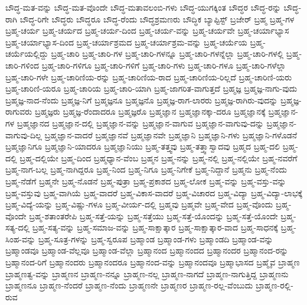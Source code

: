 {ಬೌದ್ಧ-ಮತ-ವನ್ನು
ಬೌದ್ಧ-ಮತ-ವೊಂದೇ
ಬೌದ್ಧ-ಮತಾವಲಂಬಿ-ಗಳು
ಬೌದ್ಧ-ಯುಗಕ್ಕಿಂತ
ಬೌದ್ಧರ
ಬೌದ್ಧ-ರನ್ನು
ಬೌದ್ಧ-ರಾಗಿ
ಬೌದ್ಧ-ರಿಗೇ
ಬೌದ್ಧರು
ಬೌದ್ಧರೂ
ಬೌದ್ಧ-ರೆಂದು
ಬೌದ್ಧಶ್ರಮಣರು
ಬೌದ್ಧಿಕ
ಬ್ಯಾಪ್ಟಿಸ್ಟ್
ಬ್ರಜೇರ್
ಬ್ರಹ್ಮ
ಬ್ರಹ್ಮ-ಗಳ
ಬ್ರಹ್ಮ-ಚರ್ಯ
ಬ್ರಹ್ಮ-ಚರ್ಯದ
ಬ್ರಹ್ಮ-ಚರ್ಯ-ದಿಂದ
ಬ್ರಹ್ಮ-ಚರ್ಯ-ವನ್ನು
ಬ್ರಹ್ಮ-ಚರ್ಯವೇ
ಬ್ರಹ್ಮ-ಚರ್ಯಾಭ್ಯಾಸ
ಬ್ರಹ್ಮ-ಚರ್ಯಾಭ್ಯಾಸ-ದಿಂದ
ಬ್ರಹ್ಮ-ಚರ್ಯಾಶ್ರಮದ
ಬ್ರಹ್ಮ-ಚರ್ಯಾಶ್ರಮ-ವನ್ನು
ಬ್ರಹ್ಮ-ಚರ್ಯೆಯ
ಬ್ರಹ್ಮ-ಚರ್ಯೆಯಲ್ಲಿದ್ದು
ಬ್ರಹ್ಮ-ಚಾರಿ
ಬ್ರಹ್ಮ-ಚಾರಿ-ಗಳ
ಬ್ರಹ್ಮ-ಚಾರಿ-ಗಳನ್ನೂ
ಬ್ರಹ್ಮ-ಚಾರಿ-ಗಳನ್ನೆಲ್ಲಾ
ಬ್ರಹ್ಮ-ಚಾರಿ-ಗಳಲ್ಲಿ
ಬ್ರಹ್ಮ-ಚಾರಿ-ಗಳಿಂದ
ಬ್ರಹ್ಮ-ಚಾರಿ-ಗಳಿಗೂ
ಬ್ರಹ್ಮ-ಚಾರಿ-ಗಳಿಗೆ
ಬ್ರಹ್ಮ-ಚಾರಿ-ಗಳು
ಬ್ರಹ್ಮ-ಚಾರಿ-ಗಳೂ
ಬ್ರಹ್ಮ-ಚಾರಿ-ಗಳೆಲ್ಲಾ
ಬ್ರಹ್ಮ-ಚಾರಿ-ಗಳೇ
ಬ್ರಹ್ಮ-ಚಾರಿಣಿಯ-ರನ್ನು
ಬ್ರಹ್ಮ-ಚಾರಿಣಿಯ-ರಾದ
ಬ್ರಹ್ಮ-ಚಾರಿಣಿಯ-ರಿಲ್ಲದೆ
ಬ್ರಹ್ಮ-ಚಾರಿಣಿ-ಯರು
ಬ್ರಹ್ಮ-ಚಾರಿಣಿ-ಯರೂ
ಬ್ರಹ್ಮ-ಚಾರಿಯ
ಬ್ರಹ್ಮ-ಚಾರಿ-ಯಾಗಿ
ಬ್ರಹ್ಮ-ಜಾಗರಿತ-ವಾಗುತ್ತದೆ
ಬ್ರಹ್ಮಜ್ಞ
ಬ್ರಹ್ಮಜ್ಞ-ನಾಗು-ವುದು
ಬ್ರಹ್ಮಜ್ಞ-ನಾದ-ನೆಂದು
ಬ್ರಹ್ಮಜ್ಞ-ನಿಗೆ
ಬ್ರಹ್ಮಜ್ಞನೂ
ಬ್ರಹ್ಮಜ್ಞನೊ
ಬ್ರಹ್ಮಜ್ಞ-ರಾಗ-ಲಾರರು
ಬ್ರಹ್ಮಜ್ಞ-ರಾಗಿರು-ವುದನ್ನು
ಬ್ರಹ್ಮಜ್ಞ-ರಾಗುವರು
ಬ್ರಹ್ಮಜ್ಞರು
ಬ್ರಹ್ಮಜ್ಞ-ರೆಂದಾದರೂ
ಬ್ರಹ್ಮಜ್ಞರೊ
ಬ್ರಹ್ಮಜ್ಞಾನ
ಬ್ರಹ್ಮಜ್ಞಾನಕ್ಕಾ-ದರೂ
ಬ್ರಹ್ಮಜ್ಞಾನಕ್ಕೆ
ಬ್ರಹ್ಮಜ್ಞಾನ-ಗಳ
ಬ್ರಹ್ಮಜ್ಞಾನದ
ಬ್ರಹ್ಮಜ್ಞಾನ-ದಲ್ಲಿ
ಬ್ರಹ್ಮಜ್ಞಾನ-ವನ್ನು
ಬ್ರಹ್ಮಜ್ಞಾನ-ವಾಗುವ
ಬ್ರಹ್ಮಜ್ಞಾನ-ವಾಗುವು-ದನ್ನು
ಬ್ರಹ್ಮಜ್ಞಾನ-ವಾಗುವು-ದಿಲ್ಲ
ಬ್ರಹ್ಮಜ್ಞಾನ-ವಾದರೆ
ಬ್ರಹ್ಮಜ್ಞಾನವೆ
ಬ್ರಹ್ಮಜ್ಞಾನವೇ
ಬ್ರಹ್ಮಜ್ಞಾನಿ
ಬ್ರಹ್ಮಜ್ಞಾನಿ-ಗಳು
ಬ್ರಹ್ಮಜ್ಞಾನಿ-ಗಳೊಡನೆ
ಬ್ರಹ್ಮಜ್ಞಾನಿಗೂ
ಬ್ರಹ್ಮಜ್ಞಾನಿ-ಯಾದರೂ
ಬ್ರಹ್ಮಜ್ಞಾನಿಯು
ಬ್ರಹ್ಮ-ತತ್ತ್ವವು
ಬ್ರಹ್ಮ-ತತ್ತ್ವಾಸ್ವಾದವು
ಬ್ರಹ್ಮದ
ಬ್ರಹ್ಮ-ದಲಿ
ಬ್ರಹ್ಮ-ದಲ್ಲಿ
ಬ್ರಹ್ಮ-ದಲ್ಲಿಯೇ
ಬ್ರಹ್ಮ-ದಿಂದ
ಬ್ರಹ್ಮಧ್ಯಾನ-ವೆಂಬ
ಬ್ರಹ್ಮನ
ಬ್ರಹ್ಮ-ನನ್ನು
ಬ್ರಹ್ಮ-ನಲ್ಲಿ
ಬ್ರಹ್ಮ-ನಲ್ಲಿಯೇ
ಬ್ರಹ್ಮ-ನವರೆಗೆ
ಬ್ರಹ್ಮ-ನಾಗ-ಬಲ್ಲ
ಬ್ರಹ್ಮ-ನಾಗಿದ್ದರೂ
ಬ್ರಹ್ಮ-ನಿಂದ
ಬ್ರಹ್ಮ-ನಿಗೂ
ಬ್ರಹ್ಮ-ನಿಗೇಕೆ
ಬ್ರಹ್ಮ-ನಿದ್ದಾನೆ
ಬ್ರಹ್ಮನು
ಬ್ರಹ್ಮ-ನೆಂದು
ಬ್ರಹ್ಮ-ನೆಡೆಗೆ
ಬ್ರಹ್ಮನೇ
ಬ್ರಹ್ಮ-ನೊಡನೆ
ಬ್ರಹ್ಮ-ಪುತ್ರಾ
ಬ್ರಹ್ಮ-ಪ್ರಕಾಶದ
ಬ್ರಹ್ಮ-ಲೋಕ
ಬ್ರಹ್ಮ-ವನ್ನು
ಬ್ರಹ್ಮ-ವಸ್ತು-ವನ್ನು
ಬ್ರಹ್ಮ-ವಸ್ತುವು
ಬ್ರಹ್ಮ-ವಾಗಿಯೆ
ಬ್ರಹ್ಮ-ವಾದರೆ
ಬ್ರಹ್ಮ-ವಿಕಾಸ-ವಾದರೆ
ಬ್ರಹ್ಮ-ವಿಚಾರದ
ಬ್ರಹ್ಮ-ವಿದ್ಯಾ
ಬ್ರಹ್ಮ-ವಿದ್ಯಾ-ಲಾಭಕ್ಕೆ
ಬ್ರಹ್ಮ-ವಿದ್ಯೆ-ಯನ್ನು
ಬ್ರಹ್ಮ-ವಿಷ್ಣು-ಗಳೂ
ಬ್ರಹ್ಮ-ವೀರ್ಯ-ದಲ್ಲಿ
ಬ್ರಹ್ಮವು
ಬ್ರಹ್ಮವೇ
ಬ್ರಹ್ಮ-ವೇದ
ಬ್ರಹ್ಮ-ವೊಂದು
ಬ್ರಹ್ಮ-ವೊಂದೇ
ಬ್ರಹ್ಮ-ಶತಾಂತರೇಪಿ
ಬ್ರಹ್ಮ-ಸತ್ತೆ-ಯನ್ನು
ಬ್ರಹ್ಮ-ಸತ್ತೆಯು
ಬ್ರಹ್ಮ-ಸತ್ತೆ-ಯೊಂದನ್ನು
ಬ್ರಹ್ಮ-ಸತ್ತೆ-ಯೊಂದೇ
ಬ್ರಹ್ಮ-ಸತ್ಯ-ದಲ್ಲಿ
ಬ್ರಹ್ಮ-ಸತ್ಯ-ವನ್ನು
ಬ್ರಹ್ಮ-ಸಮಾಜ-ವನ್ನು
ಬ್ರಹ್ಮ-ಸಾಕ್ಷಾತ್ಕಾರ
ಬ್ರಹ್ಮ-ಸಾಕ್ಷಾತ್ಕಾರ-ವಾದ
ಬ್ರಹ್ಮ-ಸಾಧನಕ್ಕೆ
ಬ್ರಹ್ಮ-ಸಿಂಹ-ವನ್ನು
ಬ್ರಹ್ಮ-ಸೂತ್ರ-ಗಳನ್ನು
ಬ್ರಹ್ಮ-ಸ್ವರೂಪ
ಬ್ರಹ್ಮಾಂಡ
ಬ್ರಹ್ಮಾಂಡ-ಗಳು
ಬ್ರಹ್ಮಾಂಡದಿ
ಬ್ರಹ್ಮಾಂಡ-ವನ್ನು
ಬ್ರಹ್ಮಾಂಡವೂ
ಬ್ರಹ್ಮಾಂಡ-ವೆಲ್ಲವೂ
ಬ್ರಹ್ಮಾಂಡ-ವೆಲ್ಲಾ
ಬ್ರಹ್ಮಾನಂದ
ಬ್ರಹ್ಮಾನಂದದ
ಬ್ರಹ್ಮಾನಂದರ
ಬ್ರಹ್ಮಾನಂದ-ರನ್ನು
ಬ್ರಹ್ಮಾನಂದ-ರಿಗೆ
ಬ್ರಹ್ಮಾನಂದರು
ಬ್ರಹ್ಮಾನಂದರೂ
ಬ್ರಹ್ಮಾನಂದ-ವನ್ನು
ಬ್ರಹ್ಮಾನಂದವೂ
ಬ್ರಹ್ಮಾಭಾಸದ
ಬ್ರಹ್ಮೈವ
ಬ್ರಾಹ್ಮಣ
ಬ್ರಾಹ್ಮಣತ್ವ-ವನ್ನು
ಬ್ರಾಹ್ಮಣನ
ಬ್ರಾಹ್ಮಣ-ನನ್ನೂ
ಬ್ರಾಹ್ಮಣ-ನಲ್ಲ
ಬ್ರಾಹ್ಮಣ-ನಾಗದೆ
ಬ್ರಾಹ್ಮಣ-ನಾಗುತ್ತಿದ್ದ
ಬ್ರಾಹ್ಮಣನು
ಬ್ರಾಹ್ಮಣನೂ
ಬ್ರಾಹ್ಮಣ-ನೆಂದರೆ
ಬ್ರಾಹ್ಮಣ-ನೆಂದು
ಬ್ರಾಹ್ಮಣನೇ
ಬ್ರಾಹ್ಮಣರ
ಬ್ರಾಹ್ಮಣ-ರಲ್ಲ-ವೆಂಬುದು
ಬ್ರಾಹ್ಮಣ-ರಲ್ಲಿ-ರುವ
}
